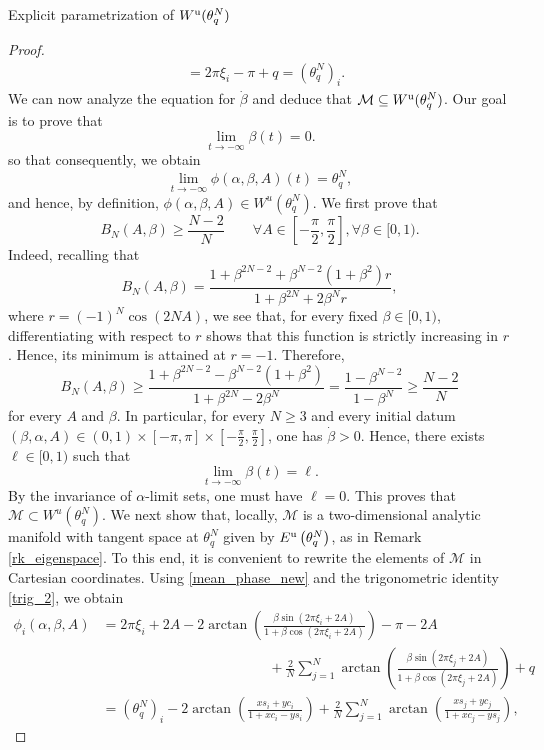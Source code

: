 \documentclass{article}
\theoremstyle{definition}
\newcommand{\jump}{\hfill\break}
\renewcommand{\u}{\textnormal{u}}
\begin{document}
\begin{section}{Explicit parametrization of $W^\u(\theta^N_q)$}
\begin{proof}
\begin{align*}
        &=2\pi\xi_i-\pi+q=(\theta^N_q)_i.
\end{align*}
 We can now analyze the equation for $\dot{\beta}$ and deduce that $\mathcal{M}\subseteq W^\u(\theta^N_q)$. Our goal is to prove that
    $$\underset{t\rightarrow-\infty}{\lim}\beta(t)=0.$$
so that consequently, we obtain
    $$\underset{t\rightarrow-\infty}{\lim}\phi(\alpha,\beta,A)(t)=\theta^N_q,$$
and hence, by definition, $\phi(\alpha,\beta,A)\in W^u(\theta^N_q)$. We first prove that
    $$B_N(A,\beta)\geq\frac{N-2}{N}\qquad \forall A\in\left[-\frac{\pi}{2},\frac{\pi}{2}\right],\forall\beta\in[0,1).$$
Indeed, recalling that
    $$B_N(A,\beta)=\frac{1+\beta^{2N-2}+\beta^{N-2}(1+\beta^2) r}{1+\beta^{2N}+2\beta^N r},$$
where $r=(-1)^N\cos(2NA)$, we see that, for every fixed $\beta\in[0,1)$, differentiating with respect to $r$ shows that this function is strictly increasing in $r$. Hence, its minimum is attained at $r=-1$. Therefore,
    $$B_N(A,\beta)\geq\frac{1+\beta^{2N-2}-\beta^{N-2}(1+\beta^2)}{1+\beta^{2N}-2\beta^N}=\frac{1-\beta^{N-2}}{1-\beta^N}\geq\frac{N-2}{N}$$
for every $A$ and $\beta$. In particular, for every $N\geq3$ and every initial datum $(\beta,\alpha,A)\in(0,1)\times[-\pi,\pi]\times\left[-\frac{\pi}{2},\frac{\pi}{2}\right]$, one has $\dot{\beta}>0$. Hence, there exists $\ell\in[0,1)$ such that
    $$\underset{t\rightarrow-\infty}{\lim}\beta(t)=\ell.$$
By the invariance of $\alpha$-limit sets, one must have $\ell=0$. This proves that $\mathcal{M}\subset W^u(\theta^N_q)$.\jump\jump\noindent
\fbox{\textbf{Step 3:} $W^\u_{loc}(\theta^N_q)\cap\mathcal{U}=\mathcal{M}\cap\mathcal{U}$}
We next show that, locally, $\mathcal{M}$ is a two-dimensional analytic manifold with tangent space at $\theta^N_q$ given by $E^\u\left(\theta^N_q\right)$, as in Remark \ref{rk_eigenspace}. To this end, it is convenient to rewrite the elements of $\mathcal{M}$ in Cartesian coordinates. Using \eqref{mean_phase_new} and the trigonometric identity \eqref{trig_2}, we obtain
\begin{align*}
        \phi_i(\alpha,\beta,A)
        &=2\pi\xi_i+2A-2\arctan\left(\frac{\beta\sin(2\pi\xi_i+2A)}{1+\beta\cos(2\pi\xi_i+2A)}\right)-\pi-2A\\
        &\hspace{5cm}
        +\frac{2}{N}\sum_{j=1}^N\arctan\left(\frac{\beta\sin(2\pi\xi_j+2A)}{1+\beta\cos(2\pi\xi_j+2A)}\right)+q\\
        &=\left(\theta^N_q\right)_i
        -2\arctan\left(\frac{x s_i+yc_i}{1+xc_i-ys_i}\right)
        +\frac{2}{N}\sum_{j=1}^N\arctan\left(\frac{x s_j+yc_j}{1+xc_j-ys_j}\right),

\end{align*}
\end{proof}
\end{section}
\end{document}
